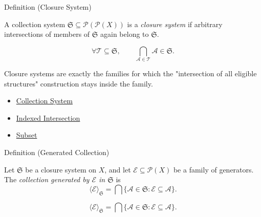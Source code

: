 \begin{definitionbox}{Definition (Closure System)}
\begin{definition}\label{def:closure-system}
A collection system $\mathfrak{S}\subseteq\mathcal{P}(\mathcal{P}(X))$ is a
\emph{closure system} if arbitrary intersections of members of $\mathfrak{S}$
again belong to $\mathfrak{S}$.
\end{definition}
\end{definitionbox}

\begin{remark*}
\[
\forall \mathcal{T}\subseteq\mathfrak{S},\qquad
\bigcap_{\mathcal{A}\in\mathcal{T}}\mathcal{A}\in\mathfrak{S}.
\]
\end{remark*}

\begin{remark*}[Interpretation]
Closure systems are exactly the families for which the "intersection of all
eligible structures" construction stays inside the family.
\end{remark*}


\begin{dependencies}
\begin{itemize}
  \item \hyperref[def:collection-system]{Collection System}
  \item \hyperref[def:indexed-intersection]{Indexed Intersection}
  \item \hyperref[def:subset]{Subset}
\end{itemize}
\end{dependencies}

\begin{definitionbox}{Definition (Generated Collection)}
\begin{definition}\label{def:generated-collection}
Let $\mathfrak{S}$ be a closure system on $X$, and let
$\mathcal{E}\subseteq\mathcal{P}(X)$ be a family of generators.  The
\emph{collection generated by $\mathcal{E}$ in $\mathfrak{S}$} is
\[
\langle\mathcal{E}\rangle_{\mathfrak{S}}
=
\bigcap\{\mathcal{A}\in\mathfrak{S}:\mathcal{E}\subseteq\mathcal{A}\}.
\]
\end{definition}
\end{definitionbox}

\begin{remark*}
\[
\langle\mathcal E\rangle_{\mathfrak S}
=
\bigcap\{\mathcal A\in\mathfrak S:\mathcal E\subseteq\mathcal A\}.
\]
\end{remark*}


